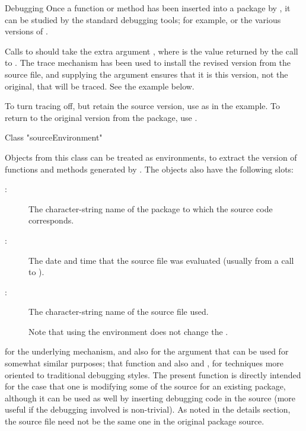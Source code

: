 %
\begin{Section}{Debugging}
Once a function or method has been inserted into a package by
, it can be studied by the standard debugging tools;
for example,  or the various versions of
.

Calls to  should take the extra argument , where  is the value returned by the call to
.
The trace mechanism has been used to install the revised version from
the source file, and supplying the argument ensures that it is this
version, not the original, that will be traced.  See the example
below.

To turn tracing off, but retain the source version, use  as in the example.  To return to the original version
from the package, use .
\end{Section}
%
\begin{Section}{Class "sourceEnvironment"}

Objects from this class can be treated as environments, to extract the
version of functions and methods generated by .
The objects also have the following slots:
\begin{description}

\item[:]  The character-string name of the package
to which the source code corresponds.

\item[:]  The date and time that the source file was
evaluated (usually from a call to ).

\item[:]  The character-string name of the source file
used.

Note that using the environment does not change the .

\end{description}

\end{Section}
%
\begin{SeeAlso}\relax
{} for the underlying mechanism, and also for the
 argument that can be used for somewhat similar purposes;
that function and also  and
, for techniques more oriented to
traditional debugging styles.
The present function is directly intended for the case that one is
modifying some of the source for an existing package, although it can
be used as well by inserting debugging code in the source (more useful
if the debugging involved is non-trivial).  As noted in the details
section, the source
file need not be the same one in the original package source.
\end{SeeAlso}
